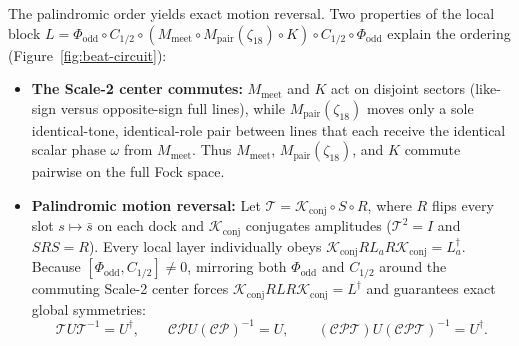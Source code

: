 The palindromic order yields exact motion reversal. Two properties of the local
block $L = \Phi_{\mathrm{odd}} \circ C_{1/2} \circ (M_{\mathrm{meet}} \circ M_{\mathrm{pair}}(\zeta_{18}) \circ K)
\circ C_{1/2} \circ \Phi_{\mathrm{odd}}$ explain the ordering (Figure~\ref{fig:beat-circuit}):
\begin{itemize}[itemsep=2pt]
\item \textbf{The Scale-2 center commutes:} $M_{\mathrm{meet}}$ and $K$ act on disjoint sectors (like-sign
versus opposite-sign full lines), while $M_{\mathrm{pair}}(\zeta_{18})$ moves only a sole identical-tone, identical-role
pair between lines that each receive the identical scalar phase $\omega$ from $M_{\mathrm{meet}}$. Thus
$M_{\mathrm{meet}}$, $M_{\mathrm{pair}}(\zeta_{18})$, and $K$ commute pairwise on the full Fock space.
\item \textbf{Palindromic motion reversal:} Let $\mathcal{T} = \mathcal{K}_{\mathrm{conj}} \circ S \circ R$, where
$R$ flips every slot $s \mapsto \bar{s}$ on each dock and $\mathcal{K}_{\mathrm{conj}}$ conjugates amplitudes
($\mathcal{T}^2 = I$ and $S R S = R$). Every local layer individually obeys
$\mathcal{K}_{\mathrm{conj}} R L_a R \mathcal{K}_{\mathrm{conj}} = L_a^\dagger$. Because
$[\Phi_{\mathrm{odd}}, C_{1/2}] \neq 0$, mirroring both $\Phi_{\mathrm{odd}}$ and $C_{1/2}$ around the commuting
Scale-2 center forces $\mathcal{K}_{\mathrm{conj}} R L R \mathcal{K}_{\mathrm{conj}} = L^\dagger$ and guarantees exact
global symmetries:
\begin{equation}
\mathcal{T} U \mathcal{T}^{-1} = U^\dagger,
\qquad
\mathcal{CP} U (\mathcal{CP})^{-1} = U,
\qquad
(\mathcal{CPT}) U (\mathcal{CPT})^{-1} = U^\dagger.
\label{eq:exact-symmetries}
\end{equation}
\end{itemize}

